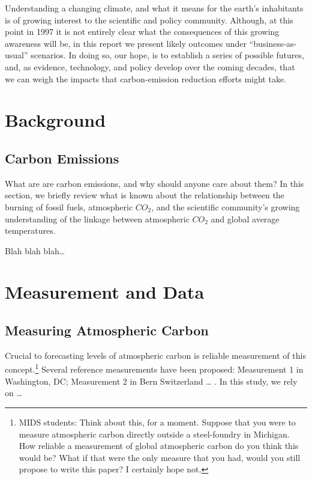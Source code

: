 \documentclass[AER]{AEA}
\begin{document}
Understanding a changing climate, and what it means for the earth's
inhabitants is of growing interest to the scientific and policy
community. Although, at this point in 1997 it is not entirely clear what
the consequences of this growing awareness will be, in this report we
present likely outcomes under ``business-as-usual'' scenarios. In doing
so, our hope, is to establish a series of possible futures, and, as
evidence, technology, and policy develop over the coming decades, that
we can weigh the impacts that carbon-emission reduction efforts might
take.

\hypertarget{background}{%
\section{Background}\label{background}}

\hypertarget{carbon-emissions}{%
\subsection{Carbon Emissions}\label{carbon-emissions}}

What are are carbon emissions, and why should anyone care about them? In
this section, we briefly review what is known about the relationship
between the burning of fossil fuels, atmospheric \(CO_{2}\), and the
scientific community's growing understanding of the linkage between
atmospheric \(CO_{2}\) and global average temperatures.

Blah blah blah\ldots{}

\hypertarget{measurement-and-data}{%
\section{Measurement and Data}\label{measurement-and-data}}

\hypertarget{measuring-atmospheric-carbon}{%
\subsection{Measuring Atmospheric
Carbon}\label{measuring-atmospheric-carbon}}

Crucial to forecasting levels of atmospheric carbon is reliable
measurement of this
concept.\footnote{MIDS students: Think about this, for a moment. Suppose that you were to measure atmospheric carbon directly outside a steel-foundry in Michigan. How reliable a measurement of global atmospheric carbon do you think this would be? What if that were the only measure that you had, would you still propose to write this paper? I certainly hope not.}
Several reference measurements have been proposed: Measurement 1 in
Washington, DC; Measurement 2 in Bern Switzerland \ldots{} . In this
study, we rely on \ldots{}
\end{document}
